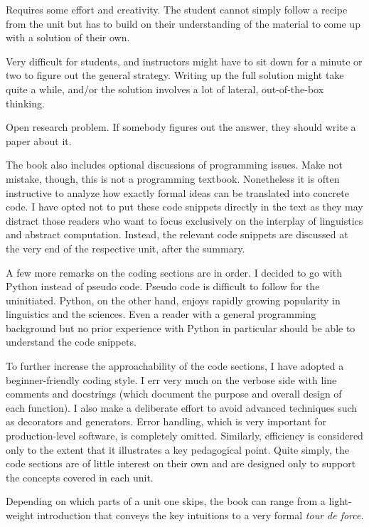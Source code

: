 \begin{homework}[*]
    Requires some effort and creativity.
    The student cannot simply follow a recipe from the unit but has to build on their understanding of the material to come up with a solution of their own.
\end{homework}

\begin{homework}[**]
    Very difficult for students, and instructors might have to sit down for a minute or two to figure out the general strategy.
    Writing up the full solution might take quite a while, and\slash or the solution involves a lot of lateral, out-of-the-box thinking.
\end{homework}

\begin{homework}[***]
    Open research problem.
    If somebody figures out the answer, they should write a paper about it.
\end{homework}

The book also includes optional discussions of programming issues.
Make not mistake, though, this is not a programming textbook.
Nonetheless it is often instructive to analyze how exactly formal ideas can be translated into concrete code.
I have opted not to put these code snippets directly in the text as they may distract those readers who want to focus exclusively on the interplay of linguistics and abstract computation.
Instead, the relevant code snippets are discussed at the very end of the respective unit, after the summary.

A few more remarks on the coding sections are in order.
I decided to go with Python instead of pseudo code.
Pseudo code is difficult to follow for the uninitiated.
Python, on the other hand, enjoys rapidly growing popularity in linguistics and the sciences.
Even a reader with a general programming background but no prior experience with Python in particular should be able to understand the code snippets.

To further increase the approachability of the code sections, I have adopted a beginner-friendly coding style.
I err very much on the verbose side with line comments and docstrings (which document the purpose and overall design of each function).
I also make a deliberate effort to avoid advanced techniques such as decorators and generators.
Error handling, which is very important for production-level software, is completely omitted.
Similarly, efficiency is considered only to the extent that it illustrates a key pedagogical point.
Quite simply, the code sections are of little interest on their own and are designed only to support the concepts covered in each unit.

Depending on which parts of a unit one skips, the book can range from a light-weight introduction that conveys the key intuitions to a very formal \emph{tour de force}.

